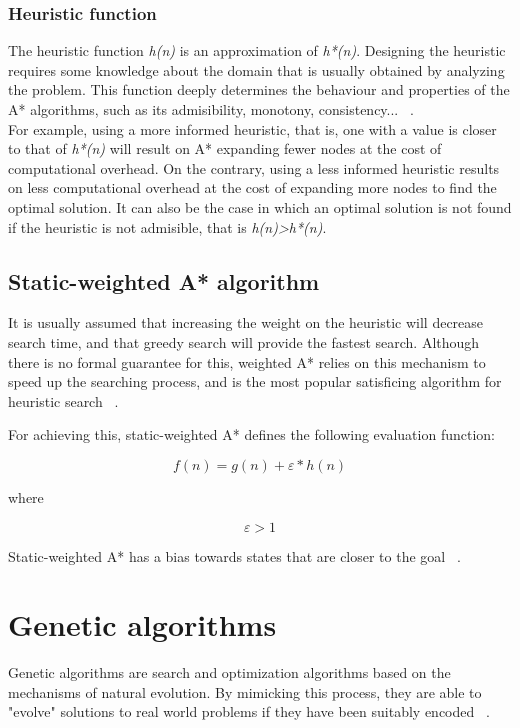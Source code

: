 \documentclass[runningheads]{llncs}
\begin{document}
\subsubsection{Heuristic function}
The heuristic function {\itshape h(n)} is an approximation of {\itshape h*(n)}. Designing the heuristic
requires some knowledge about the domain that is usually obtained by analyzing the problem.
This function deeply determines the behaviour and properties of the A* algorithms, such as its admisibility, monotony,
consistency... ~\cite{ref_url_heuristic_stanford}.\\
For example, using a more informed heuristic, that is, one with a value is closer to that of {\itshape h*(n)} will result on A*
expanding fewer nodes at the cost of computational overhead.
On the contrary, using a less informed heuristic results on less computational overhead at the cost of expanding more nodes
to find the optimal solution. It can also be the case in which an optimal solution is not found if the heuristic is not admisible, that  is {\itshape h(n)\textgreater h*(n)}.

\subsection{Static-weighted A* algorithm}
It is usually assumed that increasing the weight on the heuristic will decrease search time, and that greedy search will provide the fastest search.
Although there is no formal guarantee for this, weighted A* relies on this mechanism to speed up the searching process, and is the most popular
satisficing algorithm for heuristic search ~\cite{ref_article_a_weighted}.

For achieving this, static-weighted A* defines the following evaluation function:

 \begin{equation}
f(n) = g(n) + \varepsilon * h(n)
\end{equation}

where

\begin{equation}
\varepsilon > 1
\end{equation}

Static-weighted A* has a bias towards states that are closer to the goal ~\cite{ref_url_a_carneige}.
%
%
%
\section{Genetic algorithms}
Genetic algorithms are search and optimization algorithms based on the mechanisms of natural evolution. By mimicking this process,
they are able to "evolve" solutions to real world problems if they have been suitably encoded ~\cite{ref_url_a_carneige}. 
\end{document}
